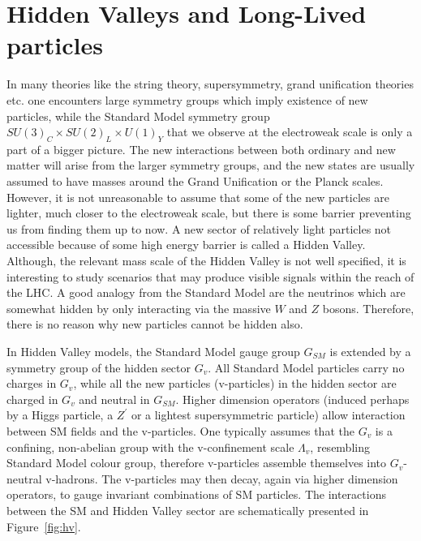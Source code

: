 \section{Hidden Valleys and Long-Lived particles}

In many theories like the string theory, supersymmetry, grand unification theories etc.
 one encounters large symmetry groups which imply existence of
new particles, while the Standard Model symmetry group $SU(3)_C \times SU(2)_L \times U(1)_Y$ 
 that we observe at the electroweak scale is only a part of a bigger picture.
The new interactions between
both ordinary and new matter will arise from the larger symmetry groups,  and  
the new states are usually
assumed to have masses around the Grand Unification or the Planck scales. However, it is not unreasonable
to assume that some of the new particles are lighter, much closer to the electroweak scale,
but there is some barrier preventing us from finding them up to now. A new sector
of relatively light particles not accessible because of some high energy barrier is called 
a Hidden Valley.
Although, the relevant mass scale of the Hidden Valley is not well
specified, it is interesting to study scenarios that may produce visible signals within 
the reach of the LHC.
A good analogy from the Standard Model are 
the neutrinos which are somewhat hidden by only interacting via the massive $W$ and $Z$ bosons.
Therefore, there is no reason why new particles cannot be hidden also. 

In Hidden Valley models, the Standard Model gauge group $G_{SM}$ is extended by a symmetry 
group of the hidden sector $G_v$. 
All Standard Model particles carry no charges in $G_v$, while
all the new particles (v-particles) in the hidden sector are charged in $G_v$ and neutral 
in $G_{SM}$. Higher dimension operators (induced perhaps by a Higgs particle, a $Z^{'}$ or
a lightest supersymmetric particle) allow interaction between SM fields and the v-particles.
One typically assumes that the $G_v$ is a confining, non-abelian group with the
v-confinement scale $\Lambda_v$, resembling Standard Model colour group,
therefore v-particles assemble themselves into $G_v$-neutral v-hadrons.
The v-particles may then decay, again via higher dimension operators, to gauge invariant 
combinations of SM particles. The interactions between the SM and Hidden Valley sector are
schematically presented in Figure~\ref{fig:hv}. 


